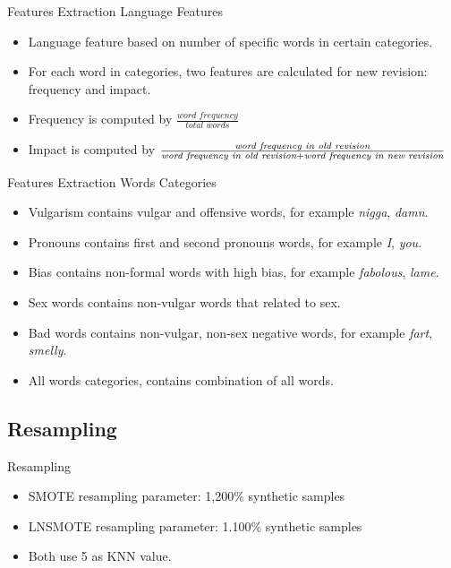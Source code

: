 \documentclass{beamer}
\begin{document}
\begin{frame}
	{Features Extraction}
	{Language Features}
	\begin{itemize}
		\item Language feature based on number of specific words in certain
		categories.
		\item For each word in categories, two features are calculated for new
		revision:
		frequency and impact.
		\item Frequency is computed by
			$\frac{\textit{word frequency}}
				{\textit{total words}}$
		\item Impact is computed by $\frac{%
				\textit{word frequency in old revision}
			}{
			\textit{word frequency in old revision}
				+ \textit{word frequency in new revision}
			} $
	\end{itemize}
\end{frame}

\begin{frame}
	{Features Extraction}
	{Words Categories}
	\begin{itemize}
		\item Vulgarism contains vulgar and offensive words, for example
		\textit{nigga}, \textit{damn}.
		\item Pronouns contains first and second pronouns words, for example
		\textit{I}, \textit{you}.
		\item Bias contains non-formal words with high bias, for example
		\textit{fabolous}, \textit{lame}.
		\item Sex words contains non-vulgar words that related to sex.
		\item Bad words contains non-vulgar, non-sex negative words, for
		example \textit{fart}, \textit{smelly}.
		\item All words categories, contains combination of all words.
	\end{itemize}
\end{frame}

\subsection{Resampling}

\begin{frame}
	{Resampling}
	\begin{itemize}
		\item SMOTE resampling parameter: 1,200\% synthetic samples
		\item LNSMOTE resampling parameter: 1.100\% synthetic samples
		\item Both use 5 as KNN value.
	\end{itemize}
	
\end{frame}
\end{document}
